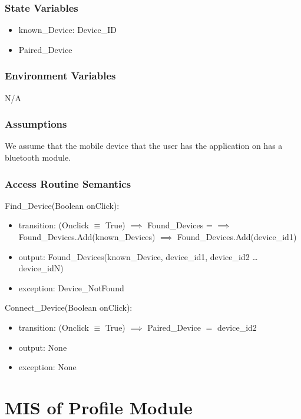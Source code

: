 \documentclass[12pt, titlepage]{article}
\begin{document}
\subsubsection{State Variables}

\begin{itemize}
  \item known\_Device: Device\_ID
  \item Paired\_Device
\end{itemize}


\subsubsection{Environment Variables}

N/A

\subsubsection{Assumptions}

We assume that the mobile device that the user has the application on has a bluetooth module.

\subsubsection{Access Routine Semantics}

\noindent Find\_Device(Boolean onClick):
\begin{itemize}
\item transition: (Onclick $\equiv$ True) $\implies$ Found\_Devices = {} $\implies$ Found\_Devices.Add(known\_Devices) $\implies$ Found\_Devices.Add(device\_id1) 
\item output: Found\_Devices(known\_Device, device\_id1, device\_id2 … device\_idN)
\item exception: Device\_NotFound 
\end{itemize}

\noindent Connect\_Device(Boolean onClick):
\begin{itemize}
\item transition: (Onclick $\equiv$ True) $\implies$ Paired\_Device $=$ device\_id2 
\item output: None
\item exception: None
\end{itemize}

\newpage



\section{MIS of Profile Module} \label{profile Module}
\end{document}

